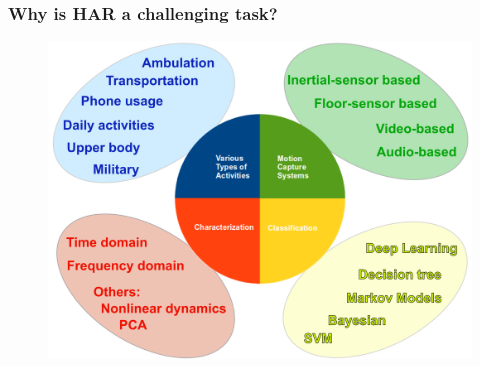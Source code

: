 \documentclass{beamer}
\begin{document}
% 
% 



\begin{frame}
	\frametitle{Why is HAR a challenging task?}
\vspace{-0.5cm}
\begin{figure}
 \includegraphics[scale=.3]{har_v0}
\vspace{-0.6cm}
\end{figure}
\end{frame}
\end{document}
